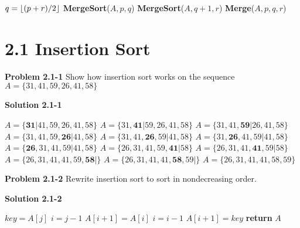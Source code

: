 \documentclass{article}
\DeclarePairedDelimiter\floor{\lfloor}{\rfloor}
\begin{document}
\medskip

\begin{algorithm}
\begin{algorithmic}[1]
	\State $q = \floor{(p+r)/2}$
	\State \textbf{MergeSort}($A,p,q$)
	\State \textbf{MergeSort}($A,q+1,r$)
	\State \textbf{Merge}($A,p,q,r$)
\EndIf
\EndProcedure
\end{algorithmic}
\end{algorithm}

\medskip

\section*{2.1 Insertion Sort}

\hrulefill

\medskip

\textbf{Problem 2.1-1} Show how insertion sort works on the sequence $A = \{ 31, 41, 59, 26, 41, 58 \}$

\medskip

\textbf{Solution 2.1-1}

\begin{algorithm}
\begin{algorithmic}[1]
\State $A = \{ \textbf{31}| 41, 59, 26, 41, 58 \}$
\State $A = \{ 31, \textbf{41}| 59, 26, 41, 58 \}$
\State $A = \{ 31, 41, \textbf{59}| 26, 41, 58 \}$
\State $A = \{ 31, 41, 59, \textbf{26}| 41, 58 \}$
\State $A = \{ 31, 41, \textbf{26}, 59| 41, 58 \}$
\State $A = \{ 31, \textbf{26}, 41, 59| 41, 58 \}$
\State $A = \{ \textbf{26}, 31, 41, 59| 41, 58 \}$
\State $A = \{ 26, 31, 41, 59, \textbf{41}| 58 \}$
\State $A = \{ 26, 31, 41, \textbf{41}, 59| 58 \}$
\State $A = \{ 26, 31, 41, 41, 59, \textbf{58}| \}$
\State $A = \{ 26, 31, 41, 41, \textbf{58}, 59| \}$
\State $A = \{ 26, 31, 41, 41, 58, 59 \}$
\end{algorithmic}
\end{algorithm}

\hrulefill

\medskip

\textbf{Problem 2.1-2} Rewrite insertion sort to sort in nondecreasing order.

\medskip

\textbf{Solution 2.1-2}

\begin{algorithm}
\begin{algorithmic}[1]
	\State $key = A[j]$
	\State $i = j-1$
		\State $A[i+1] = A[i]$
		\State $i = i-1$
	\EndWhile
	\State $A[i+1] = key$
\EndFor
\State \textbf{return} $A$
\EndProcedure
\end{algorithmic}
\end{algorithm}
\end{document}
